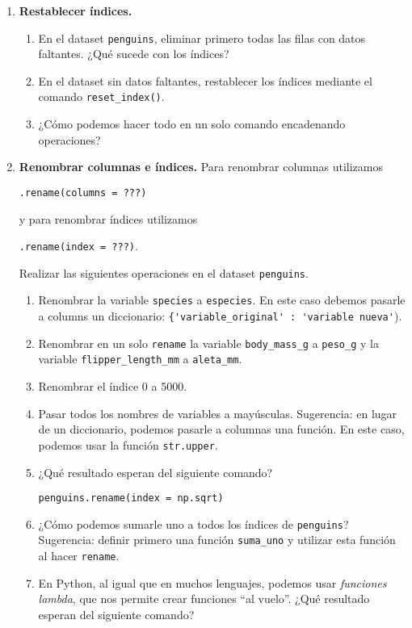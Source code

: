 \documentclass[a4paper,11pt]{article}
\theoremstyle{definition}
\begin{document}
\begin{enumerate}
\item \textbf{Restablecer índices.}
\begin{enumerate}
\item En el dataset \lstinline{penguins}, eliminar primero todas las filas con datos faltantes. ¿Qué sucede con los índices?
\item En el dataset sin datos faltantes, restablecer los índices mediante el comando \lstinline{reset_index()}.
\item ¿Cómo podemos hacer todo en un solo comando encadenando operaciones?
\end{enumerate}



\item \textbf{Renombrar columnas e \'indices.} Para renombrar columnas utilizamos

\lstinline{.rename(columns = ???)}

y para renombrar índices utilizamos

\lstinline{.rename(index = ???)}.

Realizar las siguientes operaciones en el dataset \lstinline{penguins}.
\begin{enumerate}
\item Renombrar la variable \lstinline{species} a \lstinline {especies}. En este caso debemos pasarle a columns un diccionario: \lstinline{{'variable_original' : 'variable nueva'}).
\item Renombrar en un solo \lstinline{rename} la variable \lstinline{body_mass_g} a \lstinline{peso_g} y la variable \lstinline{flipper_length_mm} a \lstinline{aleta_mm}.
\item Renombrar el \'indice 0 a 5000.
\item Pasar todos los nombres de variables a mayúsculas. Sugerencia: en lugar de un diccionario, podemos pasarle a columnas una función. En este caso, podemos usar la función \lstinline{str.upper}.
\item ¿Qué resultado esperan del siguiente comando?

\lstinline{penguins.rename(index = np.sqrt)}

\item ¿Cómo podemos sumarle uno a todos los índices de \lstinline{penguins}? Sugerencia: definir primero una función \lstinline{suma_uno} y utilizar esta función al hacer \lstinline{rename}.

\item En Python, al igual que en muchos lenguajes, podemos usar \emph{funciones lambda}, que nos permite crear funciones ``al vuelo''.
¿Qué resultado esperan del siguiente comando?


\end{enumerate}
\end{enumerate}
\end{document}
